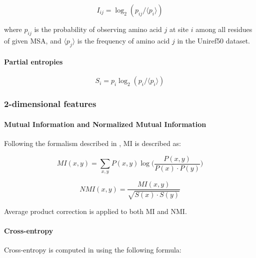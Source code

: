             \begin{equation}
                I_{ij} = \log_2 (p_{ij} / \langle p_i \rangle)
            \end{equation}

            where $p_{ij}$ is the probability of observing amino acid $j$ at site $i$ among all residues
            of given MSA, and $\langle p_j \rangle$ is the frequency of amino acid $j$
            in the Uniref50 dataset.

        \paragraph{Partial entropies}


            \begin{equation}
                S_i = p_i \log_2 (p_i / \langle p_i \rangle)
            \end{equation}

    \subsubsection{2-dimensional features}

        \paragraph{Mutual Information and Normalized Mutual Information}

            Following the formalism described in \cite{Michel383133}, MI is described as:

            \begin{equation}
                MI(x, y) = \sum\limits_{x, y} P(x, y) \log \Big( \frac{P(x, y)}{P(x) \cdot P(y)} \Big)
            \end{equation}

            \begin{equation}
                NMI(x, y) = \frac{MI(x, y)}{\sqrt{S(x) \cdot S(y)}}
            \end{equation}

            Average product correction is applied to both MI and NMI.

        \paragraph{Cross-entropy}

            Cross-entropy is computed in \cite{Michel383133} using the following formula:

